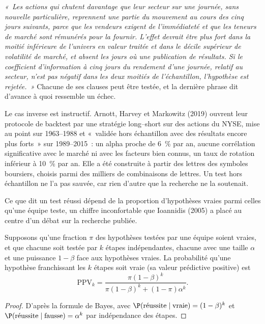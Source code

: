 \begin{example}\label{ex:rs:the-research-process:written}
\emph{«~Les actions qui chutent davantage que leur secteur sur une journée, sans nouvelle particulière, reprennent une partie du mouvement au cours des cinq
jours suivants, parce que les vendeurs exigent de l'immédiateté et que les teneurs de marché sont rémunérés pour la fournir. L'effet devrait être plus fort
dans la moitié inférieure de l'univers en valeur traitée et dans le décile supérieur de volatilité de marché, et absent les jours où
une publication de résultats. Si le coefficient d'information à cinq jours du rendement d'une journée, relatif au secteur, n'est pas négatif dans les deux
moitiés de l'échantillon, l'hypothèse est rejetée.~»} Chacune de ses clauses peut être testée, et la dernière phrase dit
d'avance à quoi ressemble un échec.
\end{example}

Le cas inverse est instructif. Arnott, Harvey et Markowitz (2019) ouvrent leur protocole de backtest par une stratégie long--short
sur des actions du NYSE, mise au point sur 1963--1988 et «~validée hors échantillon avec des résultats encore plus forts~» sur
1989--2015~: un alpha proche de 6~\% par an, aucune corrélation significative avec le marché ni avec les facteurs bien connus, un taux de rotation inférieur à
10~\% par an. Elle a été construite à partir des lettres des symboles boursiers, choisis parmi des milliers de combinaisons de lettres. Un
test hors échantillon ne l'a pas sauvée, car rien d'autre que la recherche ne la soutenait.

Ce que dit un test réussi dépend de la proportion d'hypothèses vraies parmi celles qu'une équipe teste, un chiffre inconfortable que
Ioannidis (2005) a placé au centre d'un débat sur la recherche publiée.

\begin{proposition}\label{prop:rs:the-research-process:ppv}
Supposons qu'une fraction $\pi$ des hypothèses testées par une équipe soient vraies, et que chacune soit testée par $k$ étapes indépendantes, chacune avec
une taille $\alpha$ et une puissance $1 - \beta$ face aux hypothèses vraies. La probabilité qu'une hypothèse franchissant les $k$ étapes soit vraie
(sa valeur prédictive positive) est
\[
\mathrm{PPV}_k = \frac{\pi(1 - \beta)^k}{\pi(1 - \beta)^k + (1 - \pi)\alpha^k}.
\]
\end{proposition}

\begin{proof}
D'après la formule de Bayes, avec $\P(\text{réussite} \mid \text{vraie}) = (1 - \beta)^k$ et $\P(\text{réussite} \mid \text{fausse}) = \alpha^k$ par
indépendance des étapes.
\end{proof}

